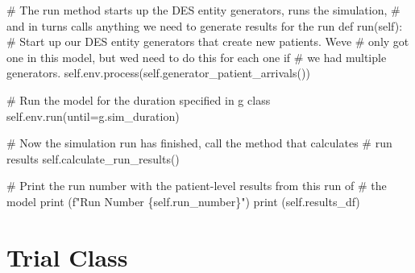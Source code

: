 \documentclass[
  letterpaper,
  DIV=11,
  numbers=noendperiod]{scrreprt}
\newenvironment{Shaded}{}{}
\newcommand{\BuiltInTok}[1]{\textcolor[rgb]{0.84,0.23,0.29}{#1}}
\newcommand{\CommentTok}[1]{\textcolor[rgb]{0.42,0.45,0.49}{#1}}
\newcommand{\KeywordTok}[1]{\textcolor[rgb]{0.84,0.23,0.29}{#1}}
\newcommand{\NormalTok}[1]{\textcolor[rgb]{0.14,0.16,0.18}{#1}}
\newcommand{\OperatorTok}[1]{\textcolor[rgb]{0.14,0.16,0.18}{#1}}
\newcommand{\SpecialCharTok}[1]{\textcolor[rgb]{0.00,0.36,0.77}{#1}}
\newcommand{\SpecialStringTok}[1]{\textcolor[rgb]{0.01,0.18,0.38}{#1}}
\newcommand{\VariableTok}[1]{\textcolor[rgb]{0.89,0.38,0.04}{#1}}
\begin{document}
\begin{Shaded}
\begin{Highlighting}[]
    \CommentTok{\# The run method starts up the DES entity generators, runs the simulation,}
    \CommentTok{\# and in turns calls anything we need to generate results for the run}
    \KeywordTok{def}\NormalTok{ run(}\VariableTok{self}\NormalTok{):}
        \CommentTok{\# Start up our DES entity generators that create new patients.  We\textquotesingle{}ve}
        \CommentTok{\# only got one in this model, but we\textquotesingle{}d need to do this for each one if}
        \CommentTok{\# we had multiple generators.}
        \VariableTok{self}\NormalTok{.env.process(}\VariableTok{self}\NormalTok{.generator\_patient\_arrivals())}

        \CommentTok{\# Run the model for the duration specified in g class}
        \VariableTok{self}\NormalTok{.env.run(until}\OperatorTok{=}\NormalTok{g.sim\_duration)}

        \CommentTok{\# Now the simulation run has finished, call the method that calculates}
        \CommentTok{\# run results}
        \VariableTok{self}\NormalTok{.calculate\_run\_results()}

        \CommentTok{\# Print the run number with the patient{-}level results from this run of}
        \CommentTok{\# the model}
        \BuiltInTok{print}\NormalTok{ (}\SpecialStringTok{f"Run Number }\SpecialCharTok{\{}\VariableTok{self}\SpecialCharTok{.}\NormalTok{run\_number}\SpecialCharTok{\}}\SpecialStringTok{"}\NormalTok{)}
        \BuiltInTok{print}\NormalTok{ (}\VariableTok{self}\NormalTok{.results\_df)}
\end{Highlighting}
\end{Shaded}

\section{Trial Class}\label{trial-class-1}
\end{document}
